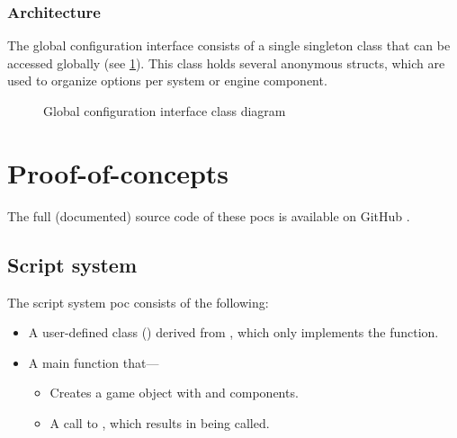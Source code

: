 \documentclass{projdoc}
\begin{document}
\subsubsection{Architecture}
\label{sec:config:architecture}

The global configuration interface consists of a single singleton class that can be
accessed globally (see \cref{fig:class-config}). This class holds several anonymous
structs, which are used to organize options per system or engine component.

\begin{figure}
	\centering
	\caption{Global configuration interface class diagram}
	\label{fig:class-config}
\end{figure}



\appendix

\section{Proof-of-concepts}

The full (documented) source code of these \glspl{poc} is available on GitHub
\autocite{crepe:code-repo}.

\subsection{Script system}
\label{poc:scripts}

The script system \gls{poc} \autocite[script example]{crepe:code-repo} consists of
the following:\noparbreak
\begin{itemize}
	\item A user-defined class () derived from
		, which only implements the  function.
	\item A main function that---
		\begin{itemize}
			\item Creates a game object with  and
				 components.
			\item A call to , which results in
				 being called.
		\end{itemize}
\end{itemize}
\end{document}
